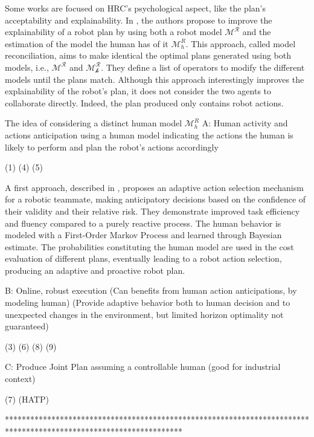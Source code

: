 Some works are focused on HRC's psychological aspect, like the plan's acceptability and explainability. In \cite{chakraborti_plan_2017}, the authors propose to improve the explainability of a robot plan by using both a robot model $\mathcal{M^R}$ and the estimation of the model the human has of it $\mathcal{M}^R_h$. This approach, called model reconciliation, aims to make identical the optimal plans generated using both models, i.e., $\mathcal{M^R}$ and $\mathcal{M^R_h}$. They define a list of operators to modify the different models until the plans match. 
Although this approach interestingly improves the explainability of the robot's plan, it does not consider the two agents to collaborate directly. Indeed, the plan produced only contains robot actions. 

The idea of considering a distinct human model $\mathcal{M}^R_h$  
A: Human activity and actions anticipation using a human model indicating the actions the human is likely to perform and plan the robot's actions accordingly 

(1) (4) (5) 

A first approach, described in \cite{hoffman_effects_2007}, proposes an adaptive action selection mechanism for a robotic teammate, making anticipatory decisions based on the confidence of their validity and their relative risk. They demonstrate improved task efficiency and fluency compared to a purely reactive process. The human behavior is modeled with a First-Order Markov Process and learned through Bayesian estimate. The probabilities constituting the human model are used in the cost evaluation of different plans, eventually leading to a robot action selection, producing an adaptive and proactive robot plan. 

B: Online, robust execution  (Can benefits from human action anticipations, by modeling human) (Provide adaptive behavior both to human decision and to unexpected changes in the environment, but limited horizon optimality not guaranteed)

(3) (6) (8) (9)

C: Produce Joint Plan assuming a controllable human (good for industrial context)

(7) (HATP)


******************************************************************************************************************


